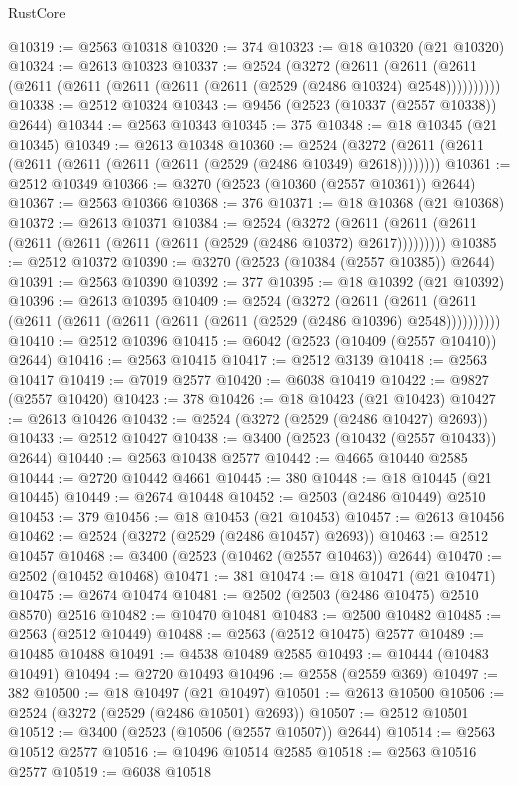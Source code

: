 \begin{lexlean}{RustCore}
\begin{coremodule}
@10319 := @2563 @10318
@10320 := 374
@10323 := @18 @10320 (@21 @10320)
@10324 := @2613 @10323
@10337 := @2524
    (@3272
      (@2611 (@2611 (@2611 (@2611 (@2611 (@2611 (@2611 (@2611 (@2529 (@2486 @10324) @2548))))))))))
@10338 := @2512 @10324
@10343 := @9456 (@2523 (@10337 (@2557 @10338)) @2644)
@10344 := @2563 @10343
@10345 := 375
@10348 := @18 @10345 (@21 @10345)
@10349 := @2613 @10348
@10360 := @2524 (@3272 (@2611 (@2611 (@2611 (@2611 (@2611 (@2611 (@2529 (@2486 @10349) @2618))))))))
@10361 := @2512 @10349
@10366 := @3270 (@2523 (@10360 (@2557 @10361)) @2644)
@10367 := @2563 @10366
@10368 := 376
@10371 := @18 @10368 (@21 @10368)
@10372 := @2613 @10371
@10384 := @2524
    (@3272 (@2611 (@2611 (@2611 (@2611 (@2611 (@2611 (@2611 (@2529 (@2486 @10372) @2617)))))))))
@10385 := @2512 @10372
@10390 := @3270 (@2523 (@10384 (@2557 @10385)) @2644)
@10391 := @2563 @10390
@10392 := 377
@10395 := @18 @10392 (@21 @10392)
@10396 := @2613 @10395
@10409 := @2524
    (@3272
      (@2611 (@2611 (@2611 (@2611 (@2611 (@2611 (@2611 (@2611 (@2529 (@2486 @10396) @2548))))))))))
@10410 := @2512 @10396
@10415 := @6042 (@2523 (@10409 (@2557 @10410)) @2644)
@10416 := @2563 @10415
@10417 := @2512 @3139
@10418 := @2563 @10417
@10419 := @7019 @2577
@10420 := @6038 @10419
@10422 := @9827 (@2557 @10420)
@10423 := 378
@10426 := @18 @10423 (@21 @10423)
@10427 := @2613 @10426
@10432 := @2524 (@3272 (@2529 (@2486 @10427) @2693))
@10433 := @2512 @10427
@10438 := @3400 (@2523 (@10432 (@2557 @10433)) @2644)
@10440 := @2563 @10438 @2577
@10442 := @4665 @10440 @2585
@10444 := @2720 @10442 @4661
@10445 := 380
@10448 := @18 @10445 (@21 @10445)
@10449 := @2674 @10448
@10452 := @2503 (@2486 @10449) @2510
@10453 := 379
@10456 := @18 @10453 (@21 @10453)
@10457 := @2613 @10456
@10462 := @2524 (@3272 (@2529 (@2486 @10457) @2693))
@10463 := @2512 @10457
@10468 := @3400 (@2523 (@10462 (@2557 @10463)) @2644)
@10470 := @2502 (@10452 @10468)
@10471 := 381
@10474 := @18 @10471 (@21 @10471)
@10475 := @2674 @10474
@10481 := @2502 (@2503 (@2486 @10475) @2510 @8570) @2516
@10482 := @10470 @10481
@10483 := @2500 @10482
@10485 := @2563 (@2512 @10449)
@10488 := @2563 (@2512 @10475) @2577
@10489 := @10485 @10488
@10491 := @4538 @10489 @2585
@10493 := @10444 (@10483 @10491)
@10494 := @2720 @10493
@10496 := @2558 (@2559 @369)
@10497 := 382
@10500 := @18 @10497 (@21 @10497)
@10501 := @2613 @10500
@10506 := @2524 (@3272 (@2529 (@2486 @10501) @2693))
@10507 := @2512 @10501
@10512 := @3400 (@2523 (@10506 (@2557 @10507)) @2644)
@10514 := @2563 @10512 @2577
@10516 := @10496 @10514 @2585
@10518 := @2563 @10516 @2577
@10519 := @6038 @10518

\end{coremodule}
\end{lexlean}
